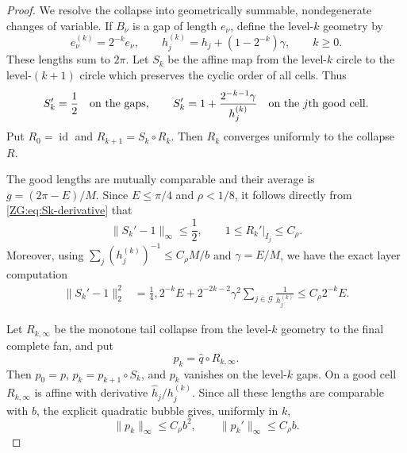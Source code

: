 \begin{proof}
We resolve the collapse into geometrically summable, nondegenerate
changes of variable.  If $B_\nu$ is a gap of length $e_\nu$, define the
level-$k$ geometry by
\begin{equation}\label{ZG:eq:dyadic-geometry}
 e_\nu^{(k)}=2^{-k}e_\nu,
 \qquad h_j^{(k)}=h_j+(1-2^{-k})\gamma,
 \qquad k\ge0.
\end{equation}
These lengths sum to $2\pi$.  Let $S_k$ be the affine map from the
level-$k$ circle to the level-$(k+1)$ circle which preserves the cyclic
order of all cells.  Thus
\begin{equation}\label{ZG:eq:Sk-derivative}
 S_k'=\frac12\quad\hbox{on the gaps},
 \qquad
 S_k'=1+\frac{2^{-k-1}\gamma}{h_j^{(k)}}
       \quad\hbox{on the $j$th good cell}.
\end{equation}
Put $R_0=\operatorname {id}$ and $R_{k+1}=S_k\circ R_k$.  Then
$R_k$ converges uniformly to the collapse $R$.

The good lengths are mutually comparable and their average is
$g=(2\pi-E)/M$.  Since $E\le\pi/4$ and $\rho<1/8$, it follows directly
from \eqref{ZG:eq:Sk-derivative} that
\begin{equation}\label{ZG:eq:Sk-uniform}
 \|S_k'-1\|_\infty\le\frac12,
 \qquad
 1\le R_k'|_{I_j}\le C_\rho .
\end{equation}
Moreover, using $\sum_j(h_j^{(k)})^{-1}\le C_\rho M/b$ and
$\gamma=E/M$, we have the exact layer computation
\begin{align}
 \|S_k'-1\|_2^2
 &=\frac14,2^{-k}E
   +2^{-2k-2}\gamma^2
       \sum_{j\in\mathcal G}\frac1{h_j^{(k)}}
 \le C_\rho2^{-k}E.                         \label{ZG:eq:Sk-L2}
\end{align}

Let $R_{k,\infty}$ be the monotone tail collapse from the level-$k$
geometry to the final complete fan, and put
\begin{equation}\label{ZG:eq:pk}
 p_k=\widehat q\circ R_{k,\infty}.
\end{equation}
Then $p_0=p$, $p_k=p_{k+1}\circ S_k$, and $p_k$ vanishes on the
level-$k$ gaps.  On a good cell $R_{k,\infty}$ is affine with derivative
$\widehat h_j/h_j^{(k)}$.  Since all these lengths are comparable with
$b$, the explicit quadratic bubble gives, uniformly in $k$,
\begin{equation}\label{ZG:eq:pk-bounds}
 \|p_k\|_\infty\le C_\rho b^2,
 \qquad \|p_k'\|_\infty\le C_\rho b.
\end{equation}


\end{proof}
